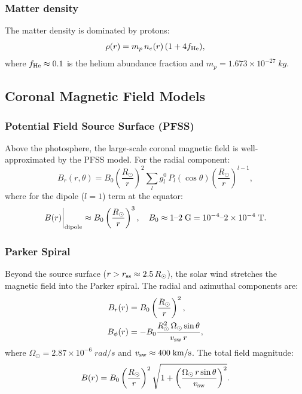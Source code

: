 \documentclass[aps,prd,twocolumn,superscriptaddress,floatfix,nofootinbib]{revtex4-2}
\newcommand{\Rsun}{R_\odot}
\begin{document}
\subsubsection{Matter density}

The matter density is dominated by protons:
\begin{equation}
\rho(r) = m_p\,n_e(r)\,(1 + 4f_{\rm He}),
\label{eq:rho-corona}
\end{equation}
where $f_{\rm He} \approx 0.1$ is the helium abundance fraction and
$m_p = 1.673 \times 10^{-27}\;\si{kg}$.

\subsection{Coronal Magnetic Field Models}\label{sec:B-models}

\subsubsection{Potential Field Source Surface (PFSS)}

Above the photosphere, the large-scale coronal magnetic field is
well-approximated by the PFSS model. For the radial component:
\begin{equation}
B_r(r, \theta) = B_0\left(\frac{\Rsun}{r}\right)^2
\sum_l g_l^0\,P_l(\cos\theta)\left(\frac{\Rsun}{r}\right)^{l-1},
\end{equation}
where for the dipole ($l=1$) term at the equator:
\begin{equation}
B(r)\bigg|_{\rm dipole} \approx B_0\left(\frac{\Rsun}{r}\right)^3,
\quad B_0 \approx 1\text{--}2\;\si{G} = 10^{-4}\text{--}2\times10^{-4}\;\si{T}.
\end{equation}

\subsubsection{Parker Spiral}

Beyond the source surface ($r > r_{\rm ss} \approx 2.5\,\Rsun$),
the solar wind stretches the magnetic field into the Parker spiral.
The radial and azimuthal components are:
\begin{align}
B_r(r) &= B_0\left(\frac{\Rsun}{r}\right)^2, \\
B_\phi(r) &= -B_0\frac{\Rsun^2\,\Omega_\odot\sin\theta}{v_{\rm sw}\,r},
\end{align}
where $\Omega_\odot = 2.87 \times 10^{-6}\;\si{rad/s}$ and
$v_{\rm sw} \approx 400\;\si{km/s}$. The total field magnitude:
\begin{equation}
B(r) = B_0\left(\frac{\Rsun}{r}\right)^2
\sqrt{1 + \left(\frac{\Omega_\odot\,r\sin\theta}{v_{\rm sw}}\right)^2}.
\end{equation}
\end{document}
